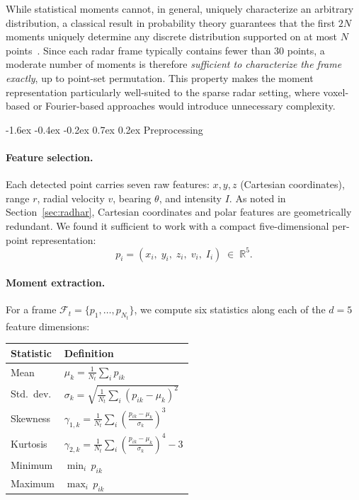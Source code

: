 \documentclass[10pt,twocolumn]{article}
\makeatletter
\renewcommand{\subsection}{%
  \@startsection{subsection}{2}{\z@}%
  {-1.6ex \@plus -0.4ex \@minus -0.2ex}%
  {0.7ex \@plus 0.2ex}%
  {\normalfont\normalsize\bfseries}}
\makeatother
\begin{document}
While statistical moments cannot, in general, uniquely characterize an arbitrary
distribution, a classical result in probability theory guarantees that the first
$2N$ moments uniquely determine any discrete distribution supported on at most
$N$ points~\cite{akhiezer1965classical}. Since each radar frame typically
contains fewer than 30 points, a moderate number of moments is therefore
\emph{sufficient to characterize the frame exactly}, up to point-set
permutation. This property makes the moment representation particularly
well-suited to the sparse radar setting, where voxel-based or
Fourier-based approaches would introduce unnecessary complexity.

\subsection{Preprocessing}
\label{sec:moments-preprocessing}

\paragraph{Feature selection.}
Each detected point carries seven raw features: $x, y, z$ (Cartesian
coordinates), range $r$, radial velocity $v$, bearing $\theta$, and intensity
$I$. As noted in Section~\ref{sec:radhar}, Cartesian coordinates and polar
features are geometrically redundant. We found it sufficient to work with a
compact five-dimensional per-point representation:
\[
p_i = (x_i,\; y_i,\; z_i,\; v_i,\; I_i) \;\in\; \mathbb{R}^5.
\]

\paragraph{Moment extraction.}
For a frame $\mathcal{F}_t = \{p_1, \ldots, p_{N_t}\}$, we compute six
statistics along each of the $d = 5$ feature dimensions:

\begin{center}
\begin{tabular}{ll}
\toprule
Statistic & Definition \\
\midrule
Mean          & $\mu_k = \frac{1}{N_t}\sum_i p_{ik}$ \\[4pt]
Std.\ dev.    & $\sigma_k = \sqrt{\frac{1}{N_t}\sum_i (p_{ik}-\mu_k)^2}$ \\[4pt]
Skewness      & $\gamma_{1,k} = \frac{1}{N_t}\sum_i \left(\frac{p_{ik}-\mu_k}{\sigma_k}\right)^3$ \\[4pt]
Kurtosis      & $\gamma_{2,k} = \frac{1}{N_t}\sum_i \left(\frac{p_{ik}-\mu_k}{\sigma_k}\right)^4 - 3$ \\[4pt]
Minimum       & $\min_i\, p_{ik}$ \\[4pt]
Maximum       & $\max_i\, p_{ik}$ \\
\bottomrule
\end{tabular}
\end{center}
\end{document}

